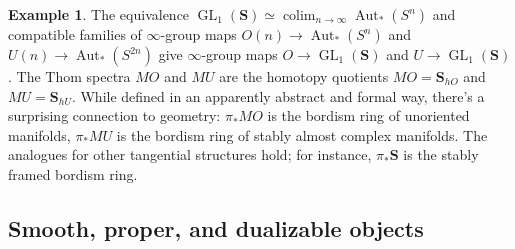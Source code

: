 \documentclass[12pt]{article}
\theoremstyle{definition}
\newtheorem{example}{Example}[subsection]
\renewcommand{\SS}{\mathbf{S}}
\renewcommand{\i}{\infty}
\DeclareMathOperator{\Aut}{Aut}
\DeclareMathOperator{\colim}{colim}
\DeclareMathOperator{\GL}{GL}
\begin{document}
\begin{example}
The equivalence $\GL_1(\SS)\simeq\colim_{n\to\infty}\Aut_*(S^n)$ and compatible families of $\i$-group maps $O(n)\to\Aut_*(S^n)$ and $U(n)\to\Aut_*(S^{2n})$ give $\i$-group maps $O\to\GL_1(\SS)$ and $U\to\GL_1(\SS)$.
The Thom spectra $MO$ and $MU$ are the homotopy quotients $MO=\SS_{hO}$ and $MU=\SS_{hU}$.
While defined in an apparently abstract and formal way, there's a surprising connection to geometry: $\pi_* MO$ is  the bordism ring of unoriented manifolds, $\pi_*MU$ is the bordism ring of stably almost complex manifolds.
The analogues for other tangential structures hold; for instance, $\pi_*\SS$ is the stably framed bordism ring.
\end{example}




\subsection{Smooth, proper, and dualizable objects}
\end{document}
